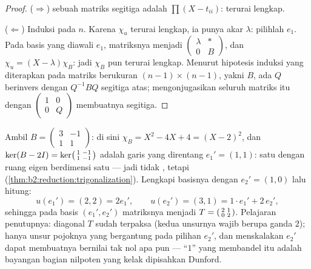 \begin{proof}
($\Rightarrow$)  sebuah matriks segitiga
adalah $\prod(X - t_{ii})$: terurai lengkap.

($\Leftarrow$) Induksi pada $n$. Karena $\chi_u$ terurai lengkap, ia
punya akar $\lambda$: pilihlah  $e_1$. Pada basis yang
diawali $e_1$, matriksnya menjadi $\begin{pmatrix} \lambda & \ast\\ 0 &
B\end{pmatrix}$, dan $\chi_u = (X - \lambda)\chi_B$: jadi $\chi_B$ pun
terurai lengkap. Menurut hipotesis induksi yang diterapkan pada matriks
berukuran $(n-1) \times (n-1)$, yakni $B$, ada $Q$ berinvers dengan $Q^{-1}BQ$
segitiga atas; mengonjugasikan seluruh matriks itu dengan $\begin{pmatrix}1 & 0\\
0 & Q\end{pmatrix}$ membuatnya segitiga.
\end{proof}

\begin{example}\label{ex:b2:reduction:trigwork}
Ambil $B = \begin{pmatrix}3 & -1\\ 1 & 1\end{pmatrix}$: di sini $\chi_B = X^2 -
4X + 4 = (X - 2)^2$, dan $\ker(B - 2I) =
\ker\begin{psmallmatrix}1 & -1\\ 1 & -1\end{psmallmatrix}$ adalah
garis yang direntang $e_1' = (1, 1)$: satu  dengan
ruang eigen berdimensi satu --- jadi tidak , tetapi
 (\cref{thm:b2:reduction:trigonalization}).
Lengkapi basisnya dengan $e_2' = (1, 0)$ lalu hitung:
\[
u(e_1') = (2, 2) = 2e_1',
\qquad
u(e_2') = (3, 1) = 1\cdot e_1' + 2\, e_2' ,
\]
sehingga pada basis $(e_1', e_2')$ matriksnya menjadi $T =
\begin{psmallmatrix}2 & 1\\ 0 & 2\end{psmallmatrix}$. Pelajaran
penutupnya: diagonal $T$ sudah terpaksa (kedua unsurnya
wajib berupa  ganda $2$); hanya unsur pojoknya yang
bergantung pada pilihan $e_2'$, dan menskalakan $e_2'$ dapat
membuatnya bernilai tak nol apa pun --- ``$1$'' yang membandel itu adalah
bayangan bagian nilpoten yang kelak dipisahkan Dunford.
\end{example}

